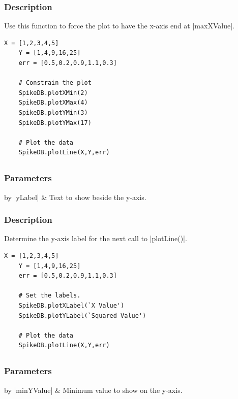 \documentclass{report}
\begin{document}
\subsubsection{Description}
Use this function to force the plot to have the x-axis end at |maxXValue|.
\begin{lstlisting}[caption=Example]
	X = [1,2,3,4,5]
	Y = [1,4,9,16,25]
	err = [0.5,0.2,0.9,1.1,0.3]

	# Constrain the plot
	SpikeDB.plotXMin(2)
	SpikeDB.plotXMax(4)
	SpikeDB.plotYMin(3)
	SpikeDB.plotYMax(17)

	# Plot the data
	SpikeDB.plotLine(X,Y,err)
\end{lstlisting}


\clearpage
\subsection[\method{void}{plotYLabel}]{}
\subsubsection{Parameters}
\begin{table}[h]
\begin{center}
\begin{tabular}{by}
		|yLabel| & Text to show beside the y-axis. \\
	\end{tabular}
\end{center}
\end{table}
\subsubsection{Description}
Determine the y-axis label for the next call to |plotLine()|.
\begin{lstlisting}[caption=Example]
	X = [1,2,3,4,5]
	Y = [1,4,9,16,25]
	err = [0.5,0.2,0.9,1.1,0.3]

	# Set the labels.
	SpikeDB.plotXLabel(`X Value')
	SpikeDB.plotYLabel(`Squared Value')

	# Plot the data
	SpikeDB.plotLine(X,Y,err)
\end{lstlisting}


\clearpage
\subsection[\method{void}{plotYMin}]{}
\subsubsection{Parameters}
\begin{table}[h]
\begin{center}
\begin{tabular}{by}
		|minYValue| & Minimum value to show on the y-axis.\\
	\end{tabular}
\end{center}
\end{table}
\end{document}

